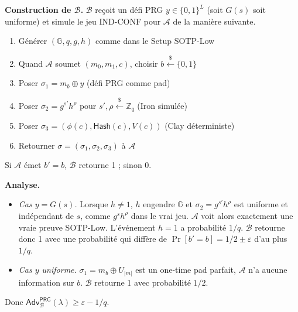 \begin{sloppypar}
\begin{Preuve}
\textbf{Construction de $\mathcal{B}$.} $\mathcal{B}$ re\c{c}oit un d\'efi
PRG $y \in \{0,1\}^L$ (soit $G(s)$ soit uniforme) et simule le jeu
IND-CONF pour $\mathcal{A}$ de la mani\`ere suivante.
\begin{enumerate}
\item G\'en\'erer $(\mathbb{G},q,g,h)$ comme dans le Setup SOTP-Low
\item Quand $\mathcal{A}$ soumet $(m_0,m_1,c)$, choisir
      $b \xleftarrow{\$} \{0,1\}$
\item Poser $\sigma_1 = m_b \oplus y$ \hfill (d\'efi PRG comme pad)
\item Poser $\sigma_2 = g^{s'}h^\rho$ pour
      $s',\rho \xleftarrow{\$} \mathbb{Z}_q$ \hfill (Iron simul\'ee)
\item Poser $\sigma_3 = (\phi(c), \mathsf{Hash}(c), V(c))$
      \hfill (Clay d\'eterministe)
\item Retourner $\sigma = (\sigma_1,\sigma_2,\sigma_3)$ \`a $\mathcal{A}$
\end{enumerate}
Si $\mathcal{A}$ \'emet $b'=b$, $\mathcal{B}$ retourne 1 ; sinon 0.

\textbf{Analyse.}
\begin{itemize}
\item \emph{Cas $y = G(s)$.} Lorsque $h \neq 1$, $h$ engendre $\mathbb{G}$ et
      $\sigma_2 = g^{s'}h^\rho$ est uniforme et ind\'ependant de $s$, comme
      $g^{s}h^\rho$ dans le vrai jeu. $\mathcal{A}$ voit alors exactement une vraie
      preuve SOTP-Low. L'\'ev\'enement $h = 1$ a probabilit\'e $1/q$. $\mathcal{B}$
      retourne donc 1 avec une probabilit\'e qui diff\`ere de
      $\Pr[b' = b] = 1/2 \pm \varepsilon$ d'au plus $1/q$.
\item \emph{Cas $y$ uniforme.} $\sigma_1 = m_b \oplus U_{|m|}$ est un
      one-time pad parfait, $\mathcal{A}$ n'a aucune information sur $b$.
      $\mathcal{B}$ retourne 1 avec probabilit\'e $1/2$.
\end{itemize}
Donc $\mathsf{Adv}^{\mathsf{PRG}}_{\mathcal{B}}(\lambda) \geq \varepsilon - 1/q$.
\end{Preuve}


\end{sloppypar}
